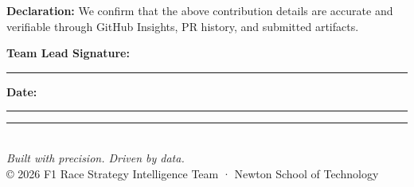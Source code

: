 \documentclass[12pt, a4paper]{article}
\begin{document}
\vspace{1cm}

\noindent\textbf{Declaration:} We confirm that the above contribution details are accurate and verifiable through GitHub Insights, PR history, and submitted artifacts.

\vspace{1.5cm}

\noindent\textbf{Team Lead Signature:} \rule{8cm}{0.4pt} \hfill \textbf{Date:} \rule{4cm}{0.4pt}

\vspace{3cm}

\begin{center}
\rule{0.4\textwidth}{0.5pt}\\[0.3cm]
{\small\textit{Built with precision. Driven by data.}}\\[0.2cm]
{\footnotesize © 2026 F1 Race Strategy Intelligence Team · Newton School of Technology}
\end{center}
\end{document}
